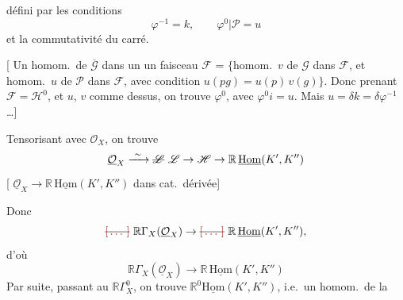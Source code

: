 \documentclass[11pt,a4paper]{article}
\begin{document}
défini par les conditions
\[
  \varphi^{-1} = k , \qquad \varphi^0 | \mathscr{P} = u
\]
et la commutativité du carré.

[ Un homom.\ de $\overline{\mathscr{G}}$ dans un
un faisceau $\mathscr{F}$ = $\{$homom.\ $v$ de $\mathscr{G}$ dans
$\mathscr{F}$, et homom.\ $u$ de $\mathscr{P}$ dans $\mathscr{F}$, avec
condition $u(pg) = u(p)\, v(g)\}$. Donc prenant $\mathscr{F} = \mathscr{H}^0$,
et $u$, $v$ comme dessus, on trouve $\varphi^0$, avec $\varphi^0 i = u$. Mais
$u = \delta$\struck{$\varphi$}$k = \delta \varphi^{-1}$ …]

Tensorisant avec $\mathcal{O}_X$, on trouve
\[
  \underline{\mathcal{O}}_X \xrightarrow{\ \sim\ } \text{\struck{$\mathscr{L}$}}
  \ \mathscr{L} \to \mathscr{H} \to \mathbb{R}\,\underline{\mathrm{Hom}}(K', K'')
\]
  [
$\underline{\mathcal{O}}_X \to \mathbb{R}\,\underline{\mathrm{Hom}}(K', K'')$ dans
cat.\ dérivée]

Donc
\[
  \text{\struck{\ill{}}}\ \mathbb{R}\Gamma_X(\underline{\mathcal{O}}_X)
  \to \text{\struck{\ill{}}}\ \mathbb{R}\,\underline{\mathrm{Hom}}(K', K'') ,
\]
d'où
\[
  \boxed{\; \mathbb{R}\Gamma_X(\underline{\mathcal{O}}_X) \to
  \mathbb{R}\,\underline{\mathrm{Hom}}(K', K'') \;}
\]
Par suite,  passant au $\mathbb{R}\Gamma^0_X$, on trouve
 $\mathbb{R}^0\underline{\mathrm{Hom}}(K', K'')$, i.e.\ un
homom.\ de la 
\end{document}
